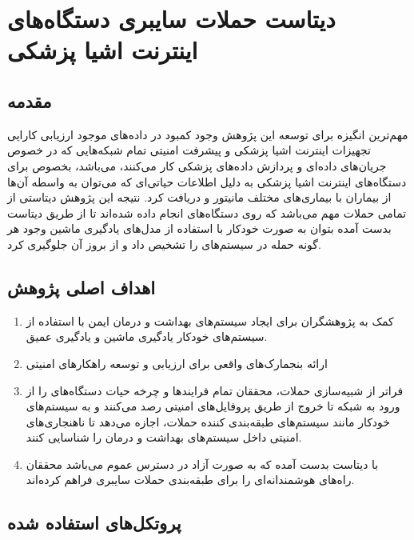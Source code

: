 \section{دیتاست حملات سایبری دستگاه‌های اینترنت اشیا پزشکی }

\subsection{مقدمه}

مهم‌ترین انگیزه برای توسعه این پژوهش \cite{dadkhah2024ciciomt2024} وجود کمبود در
داده‌های موجود ارزیابی کارایی تجهیزات اینترنت اشیا پزشکی و پیشرفت امنیتی تمام
شبکه‌هایی که در خصوص جریان‌های داده‌ای و پردازش داده‌های پزشکی کار می‌کنند،
می‌باشد، بخصوص برای دستگاه‌های اینترنت اشیا پزشکی به دلیل اطلاعات حیاتی‌ای که
می‌توان به واسطه آن‌ها از بیماران با بیماری‌های مختلف مانیتور و دریافت کرد.
نتیجه این پژوهش دیتاستی از تمامی حملات مهم می‌باشد که روی دستگاه‌های 
انجام داده‌ شده‌اند تا از طریق دیتاست بدست آمده بتوان به صورت خودکار با استفاده
از مدل‌های یادگیری ماشین وجود هر گونه حمله در سیستم‌های  را تشخیص داد و
از بروز آن جلوگیری کرد.

\subsection{اهداف اصلی پژوهش}

\begin{enumerate}
    \item کمک به پژوهشگران برای ایجاد سیستم‌های بهداشت و درمان ایمن با استفاده
    از سیستم‌های خودکار یادگیری ماشین و یادگیری عمیق.
    \item ارائه بنجمارک‌های واقعی برای ارزیابی و توسعه راهکار‌های امنیتی
    \item فراتر از شبیه‌سازی حملات، محققان تمام فرایند‌ها و چرخه حیات دستگاه‌های
     را از ورود به شبکه تا خروج از طریق پروفایل‌های امنیتی رصد می‌کنند
    و به سیستم‌های خودکار مانند سیستم‌های طبقه‌بندی کننده حملات، اجازه می‌دهد تا
    ناهنجاری‌های امنیتی داخل سیستم‌های بهداشت و درمان را شناسایی کنند.
    \item با دیتاست بدست آمده \cite{ciciomt2024Dataset} که به صورت آزاد در دسترس
    عموم می‌باشد محققان راه‌های هوشمندانه‌ای را برای طبقه‌بندی حملات سایبری
    فراهم کرده‌اند.
\end{enumerate}

\subsection{پروتکل‌های استفاده شده}

